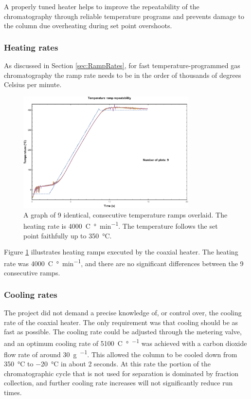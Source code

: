 A properly tuned heater helps to improve the repeatability of the chromatography
through reliable temperature programs and prevents damage to the column due
overheating during set point overshoots.

\subsubsection{Heating rates}

As discussed in Section \ref{sec:RampRates}, for fast temperature-programmed gas
chromatography the ramp rate needs to be in the order of thousands of degrees
Celsius per minute.

\begin{figure}
	\centering
	\includegraphics[width=0.8\textwidth]{Figures/high_rate_heating.pdf}
	\decoRule
		
	\caption[Heating rate illustration]{A graph of 9 identical, consecutive
	temperature ramps overlaid. The heating rate is \SI{4000}{C\degree\per\minute}.
	The temperature follows the set point faithfully up to \SI{350}{\celsius}.}

	\label{fig:4000K/min} 
\end{figure}

Figure \ref{fig:4000K/min} illustrates heating ramps executed by the coaxial
heater. The heating rate was \SI{4000}{C\degree\per\minute}, and there are no
significant differences between the 9 consecutive ramps.

\subsubsection{Cooling rates}

The project did not demand a precise knowledge of, or control over, the cooling
rate of the coaxial heater. The only requirement was that cooling should be as
fast as possible. The cooling rate could be adjusted through the metering valve,
and an optimum cooling rate of \SI{5100}{C\degree\per\min} was achieved with a
carbon dioxide flow rate of around \SI{30}{\gram\per\min}. This allowed the
column to be cooled down from \SI{350}{\celsius} to \SI{-20}{\celsius} in about
2 seconds. At this rate the portion of the chromatographic cycle that is not
used for separation is dominated by fraction collection, and further cooling
rate increases will not significantly reduce run times.

